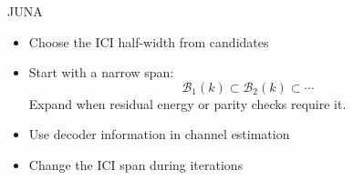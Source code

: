 \documentclass[aspectratio=169,10pt]{beamer}
\begin{document}
\begin{frame}{JUNA}
\begin{itemize}\setlength{\itemsep}{0.5em}
  \item Choose the ICI half-width from candidates
  \item Start with a narrow span:
  \[
    \mathcal B_1(k)\subset\mathcal B_2(k)\subset\cdots
  \]
  Expand when residual energy or parity checks require it.
  \item Use decoder information in channel estimation
  \item Change the ICI span during iterations
\end{itemize}
\end{frame}
\end{document}
